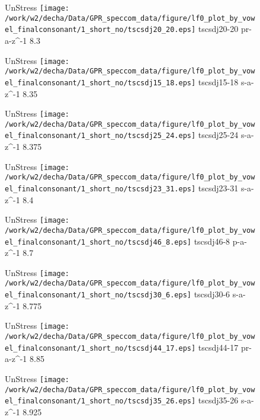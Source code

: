 \documentclass{article}
\begin{document}
\begin{figure}[t]
\begin{minipage}[b]{.24\textwidth}
UnStress
\centering
\texttt{[image: /work/w2/decha/Data/GPR\_speccom\_data/figure/lf0\_plot\_by\_vowel\_finalconsonant/1\_short\_no/tscsdj20\_20.eps]}
tscsdj20-20 pr-a-z\textasciicircum-1 8.3
\end{minipage}
\begin{minipage}[b]{.24\textwidth}
UnStress
\centering
\texttt{[image: /work/w2/decha/Data/GPR\_speccom\_data/figure/lf0\_plot\_by\_vowel\_finalconsonant/1\_short\_no/tscsdj15\_18.eps]}
tscsdj15-18 s-a-z\textasciicircum-1 8.35
\end{minipage}
\begin{minipage}[b]{.24\textwidth}
UnStress
\centering
\texttt{[image: /work/w2/decha/Data/GPR\_speccom\_data/figure/lf0\_plot\_by\_vowel\_finalconsonant/1\_short\_no/tscsdj25\_24.eps]}
tscsdj25-24 s-a-z\textasciicircum-1 8.375
\end{minipage}
\begin{minipage}[b]{.24\textwidth}
UnStress
\centering
\texttt{[image: /work/w2/decha/Data/GPR\_speccom\_data/figure/lf0\_plot\_by\_vowel\_finalconsonant/1\_short\_no/tscsdj23\_31.eps]}
tscsdj23-31 s-a-z\textasciicircum-1 8.4
\end{minipage}
\end{figure}

\begin{figure}[t]
\begin{minipage}[b]{.24\textwidth}
UnStress
\centering
\texttt{[image: /work/w2/decha/Data/GPR\_speccom\_data/figure/lf0\_plot\_by\_vowel\_finalconsonant/1\_short\_no/tscsdj46\_8.eps]}
tscsdj46-8 p-a-z\textasciicircum-1 8.7
\end{minipage}
\begin{minipage}[b]{.24\textwidth}
UnStress
\centering
\texttt{[image: /work/w2/decha/Data/GPR\_speccom\_data/figure/lf0\_plot\_by\_vowel\_finalconsonant/1\_short\_no/tscsdj30\_6.eps]}
tscsdj30-6 s-a-z\textasciicircum-1 8.775
\end{minipage}
\begin{minipage}[b]{.24\textwidth}
UnStress
\centering
\texttt{[image: /work/w2/decha/Data/GPR\_speccom\_data/figure/lf0\_plot\_by\_vowel\_finalconsonant/1\_short\_no/tscsdj44\_17.eps]}
tscsdj44-17 pr-a-z\textasciicircum-1 8.85
\end{minipage}
\begin{minipage}[b]{.24\textwidth}
UnStress
\centering
\texttt{[image: /work/w2/decha/Data/GPR\_speccom\_data/figure/lf0\_plot\_by\_vowel\_finalconsonant/1\_short\_no/tscsdj35\_26.eps]}
tscsdj35-26 s-a-z\textasciicircum-1 8.925
\end{minipage}
\end{figure}
\end{document}
